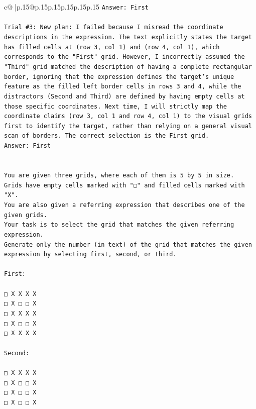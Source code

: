 \documentclass{article}
\begin{document}
{\begin{supertabular}{c@{$\;$}|p{.15\linewidth}@{}p{.15\linewidth}p{.15\linewidth}p{.15\linewidth}p{.15\linewidth}p{.15\linewidth}}
{{{\texttt{Answer: First} \\
\\ 
\texttt{Trial \#3: New plan: I failed because I misread the coordinate descriptions in the expression. The text explicitly states the target has filled cells at (row 3, col 1) and (row 4, col 1), which corresponds to the "First" grid. However, I incorrectly assumed the "Third" grid matched the description of having a complete rectangular border, ignoring that the expression defines the target's unique feature as the filled left border cells in rows 3 and 4, while the distractors (Second and Third) are defined by having empty cells at those specific coordinates. Next time, I will strictly map the coordinate claims (row 3, col 1 and row 4, col 1) to the visual grids first to identify the target, rather than relying on a general visual scan of borders. The correct selection is the First grid.} \\
\texttt{Answer: First} \\
\\ 
\\ 
\texttt{You are given three grids, where each of them is 5 by 5 in size.} \\
\texttt{Grids have empty cells marked with "▢" and filled cells marked with "X".} \\
\texttt{You are also given a referring expression that describes one of the given grids.} \\
\texttt{Your task is to select the grid that matches the given referring expression.} \\
\texttt{Generate only the number (in text) of the grid that matches the given expression by selecting first, second, or third.} \\
\\ 
\texttt{First:} \\
\\ 
\texttt{□ X X X X} \\
\texttt{□ X □ □ X} \\
\texttt{□ X X X X} \\
\texttt{□ X □ □ X} \\
\texttt{□ X X X X} \\
\\ 
\texttt{Second:} \\
\\ 
\texttt{□ X X X X} \\
\texttt{□ X □ □ X} \\
\texttt{□ X □ □ X} \\
\texttt{□ X □ □ X} \\
}}}
\end{supertabular}}
\end{document}

